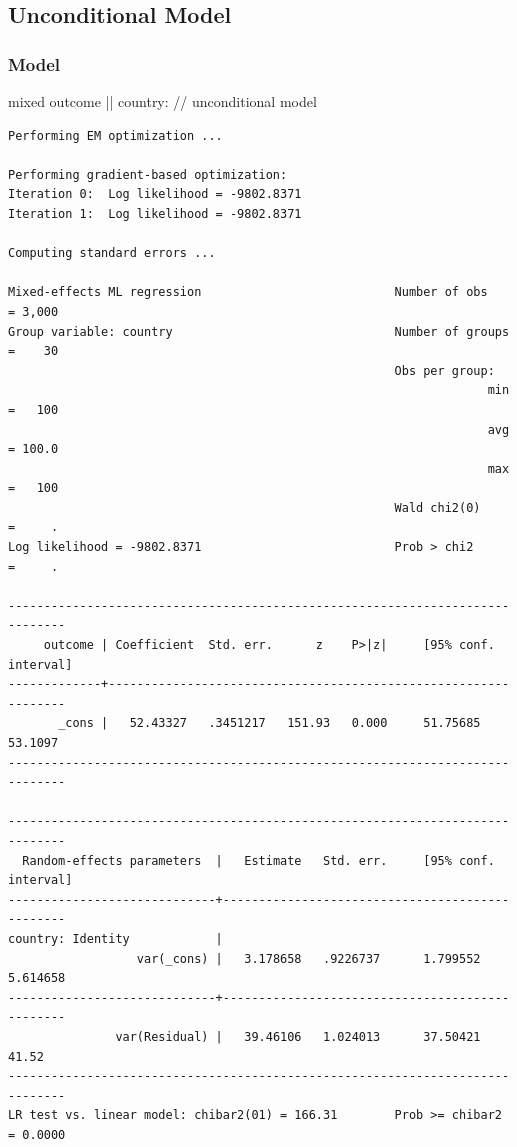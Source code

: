 \documentclass[
  letterpaper,
  DIV=11,
  numbers=noendperiod]{scrreprt}
\newenvironment{Shaded}{\begin{snugshade}}{\end{snugshade}}
\newcommand{\CommentTok}[1]{\textcolor[rgb]{0.37,0.37,0.37}{#1}}
\newcommand{\NormalTok}[1]{\textcolor[rgb]{0.00,0.23,0.31}{#1}}
\begin{document}
\subsection{Unconditional Model}\label{unconditional-model}

\subsubsection{Model}\label{model}

\begin{Shaded}
\begin{Highlighting}[]

\NormalTok{mixed outcome || country: }\CommentTok{// unconditional model}
\end{Highlighting}
\end{Shaded}

\begin{verbatim}
Performing EM optimization ...

Performing gradient-based optimization: 
Iteration 0:  Log likelihood = -9802.8371  
Iteration 1:  Log likelihood = -9802.8371  

Computing standard errors ...

Mixed-effects ML regression                           Number of obs    = 3,000
Group variable: country                               Number of groups =    30
                                                      Obs per group:
                                                                   min =   100
                                                                   avg = 100.0
                                                                   max =   100
                                                      Wald chi2(0)     =     .
Log likelihood = -9802.8371                           Prob > chi2      =     .

------------------------------------------------------------------------------
     outcome | Coefficient  Std. err.      z    P>|z|     [95% conf. interval]
-------------+----------------------------------------------------------------
       _cons |   52.43327   .3451217   151.93   0.000     51.75685     53.1097
------------------------------------------------------------------------------

------------------------------------------------------------------------------
  Random-effects parameters  |   Estimate   Std. err.     [95% conf. interval]
-----------------------------+------------------------------------------------
country: Identity            |
                  var(_cons) |   3.178658   .9226737      1.799552    5.614658
-----------------------------+------------------------------------------------
               var(Residual) |   39.46106   1.024013      37.50421       41.52
------------------------------------------------------------------------------
LR test vs. linear model: chibar2(01) = 166.31        Prob >= chibar2 = 0.0000
\end{verbatim}
\end{document}
